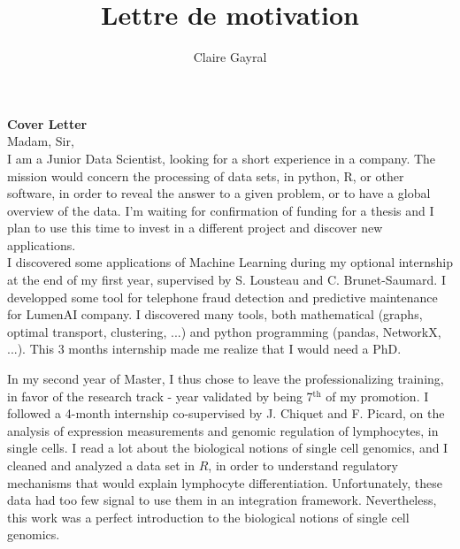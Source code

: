 \documentclass[a4paper,12pt]{article}
\title{Lettre de motivation}
\author{Claire Gayral}
\date{}
\begin{document}
{\centering \Large \bf Cover Letter  \\ \vspace{0.6cm} }
Madam, Sir, 
\\

I am a Junior Data Scientist, looking for a short experience in a company. The mission would concern the processing of data sets, in python, R, or other software, in order to reveal the answer to a given problem, or to have a global overview of the data. 
I'm waiting for confirmation of funding for a thesis and I plan to use this time to invest in a different project and discover new applications. \\

I discovered some applications of Machine Learning during my optional internship at the end of my first year, supervised by S. Lousteau and C. Brunet-Saumard.
I developped some tool for telephone fraud detection and predictive maintenance for LumenAI company.  I discovered many tools, both mathematical (graphs, optimal transport, clustering, ...) and python programming (pandas, NetworkX, ...). 
This 3 months internship made me realize that I would need a PhD. 

In my second year of Master, I thus chose to leave the professionalizing training, in favor of the research track - year validated by being 7$^{\text{th}}$ of my promotion. 
I followed a 4-month internship co-supervised by J. Chiquet and F. Picard, on the analysis of expression measurements and genomic regulation of lymphocytes, in single cells. I read a lot about the biological notions of single cell genomics, and I cleaned and analyzed a data set in $R$, in order to understand regulatory mechanisms that would explain lymphocyte differentiation. Unfortunately, these data had too few signal to use them in an integration framework. Nevertheless, this work was a perfect introduction to the biological notions of single cell genomics.
\end{document}
